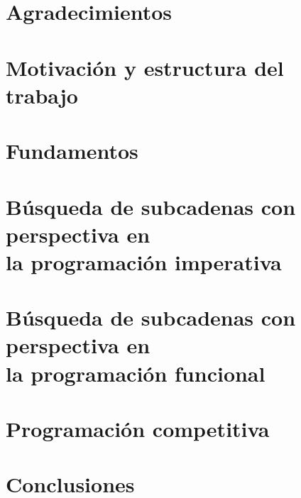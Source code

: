 \documentclass{book}
\begin{document}
\thispagestyle{empty}
\frontmatter
    
    \clearpage
    \mbox{}
    \clearpage
    \thispagestyle{empty}
    
    
    
    \chapter*{Agradecimientos}
    
    \clearpage
    
    \tableofcontents

\mainmatter
    \chapter*{Motivación y estructura del trabajo}
        
    
    \chapter{Fundamentos}
        
    
    \chapter{Búsqueda de subcadenas con perspectiva en \\la programación imperativa}
    \chaptermark{} %
        
    
    \chapter{Búsqueda de subcadenas con perspectiva en \\la programación funcional}
    \chaptermark{} %
        

    \chapter{\QuickCheck}
        

    \chapter{Programación competitiva}
        
    
    \chapter{Conclusiones}
        
    
    \begin{appendices}
        
        
                    
    \end{appendices}

\backmatter
    \nocite{*}
    \printbibliography
\end{document}
